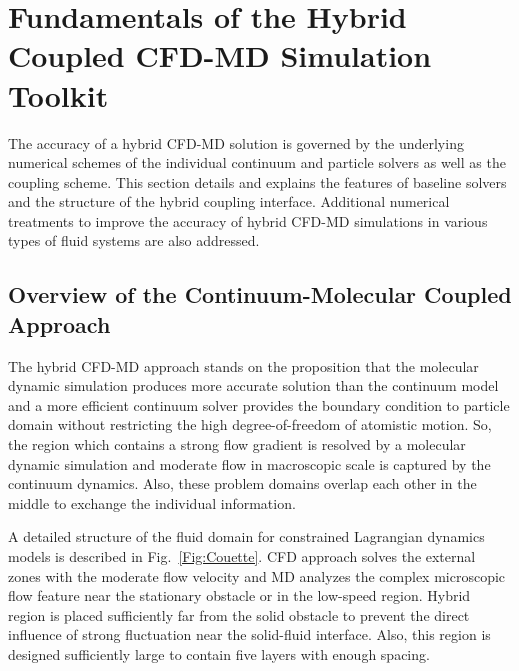\documentclass[preprint,12pt]{elsarticle}
\begin{document}
\section{Fundamentals of the Hybrid Coupled CFD-MD Simulation Toolkit}
\label{sec:numerical}


The accuracy of a hybrid CFD-MD solution is governed by the underlying numerical schemes of the individual continuum and particle solvers as well as the coupling scheme. This section details and explains the features of baseline solvers and the structure of the hybrid coupling interface. Additional numerical treatments to improve the accuracy of hybrid CFD-MD simulations in various types of fluid systems are also addressed.

\subsection{Overview of the Continuum-Molecular Coupled Approach}
The hybrid CFD-MD approach stands on the proposition that the molecular dynamic simulation produces more accurate solution than the continuum model and a more efficient continuum solver provides the boundary condition to particle domain without restricting the high degree-of-freedom of atomistic motion. So, the region which contains a strong flow gradient is resolved by a molecular dynamic simulation and moderate flow in macroscopic scale is captured by the continuum dynamics. Also, these problem domains overlap each other in the middle to exchange the individual information.

A detailed structure of the fluid domain for constrained Lagrangian dynamics models is described in Fig.~\ref{Fig:Couette}. CFD approach solves the external zones with the moderate flow velocity and MD analyzes the complex microscopic flow feature near the stationary obstacle or in the low-speed region. Hybrid region is placed sufficiently far from the solid obstacle to prevent the direct influence of strong fluctuation near the solid-fluid interface. Also, this region is designed sufficiently large to contain five layers with enough spacing.
\end{document}
